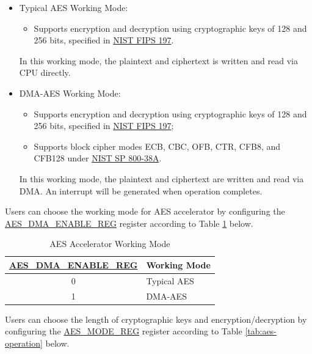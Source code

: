 \documentclass[main\_\_EN.tex]{subfiles}
\begin{document}
\begin{itemize}
    \item Typical AES Working Mode: \begin{itemize}
        \item Supports encryption and decryption using cryptographic keys of 128 and 256 bits, specified in \href{https://nvlpubs.nist.gov/nistpubs/FIPS/NIST.FIPS.197.pdf}{NIST FIPS 197}.
    \end{itemize}
    In this working mode, the plaintext and ciphertext is written and read via CPU directly.
    \item DMA-AES Working Mode:
    \begin{itemize}
        \item Supports encryption and decryption using cryptographic keys of 128 and 256 bits, specified in \href{https://nvlpubs.nist.gov/nistpubs/FIPS/NIST.FIPS.197.pdf}{NIST FIPS 197};
        \item Supports block cipher modes ECB, CBC, OFB, CTR, CFB8, and CFB128 under \href{https://nvlpubs.nist.gov/nistpubs/Legacy/SP/nistspecialpublication800-38a.pdf}{NIST SP 800-38A}.
    \end{itemize}
    In this working mode, the plaintext and ciphertext are written and read via DMA. An interrupt will be generated when operation completes.
\end{itemize}

Users can choose the working mode for AES accelerator by configuring the \hyperref[regdesc:AESDMAENABLEREG]{AES\_DMA\_ENABLE\_REG} register according to Table \ref{tab:aes-dma-enable} below.

\begin{longtable}[c]{ | c | l | }
\caption{AES Accelerator Working Mode}
    \label{tab:aes-dma-enable}
    \\\hline
    \rowcolor{lightgray}
\textbf{\hyperref[regdesc:AESDMAENABLEREG]{AES\_DMA\_ENABLE\_REG}}      & \textbf{Working Mode}\\
        \hline
        0                       & Typical AES    \\
        \hline
        1                       & DMA-AES        \\
        \hline
\end{longtable}

Users can choose the length of cryptographic keys and encryption/decryption by configuring the \hyperref[regdesc:AESMODEREG]{AES\_MODE\_REG} register according to Table \ref{tab:aes-operation} below.
\end{document}

